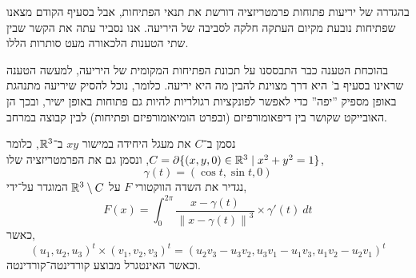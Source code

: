 \subquestion{}
בהגדרה של יריעות פתוחות פרמטריזציה דורשת את תנאי הפתיחות, אבל בסעיף הקודם מצאנו שפתיחות נובעת מקיום העתקה חלקה לסביבה של היריעה.
אנו נסביר עתה את הקשר שבין שתי הטענות הלכאורה מעט סותרות הללו.
\begin{solution}
	בהוכחת הטענה כבר התבססנו על תכונת הפתיחות המקומית של היריעה, למעשה הטענה שראינו בסעיף ב' היא דרך מצוינת להבין מה היא יריעה.
	כלומר, נוכל להסיק שיריעה מתנהגת באופן מספיק ''יפה'' כדי לאפשר לפונקציות רגולריות להיות גם פתוחות באופן ישיר, ובכך הן האובייקט שקושר בין דיפאומורפיזם (ובפרט הומיאומורפיזם ופתיחות) לבין קבוצה במרחב.
\end{solution}

\question{}
נסמן ב־$C$ את מעגל היחידה במישור $xy$ ב־$\mathbb{R}^3$, כלומר $C = \partial \{ (x, y, 0) \in \mathbb{R}^3 \mid x^2 + y^2 = 1 \}$,
ונסמן גם את הפרמטריזציה שלו,
\[
	\gamma(t)
	= (\cos t, \sin t, 0)
\]
נגדיר את השדה הווקטורי $F$ על $\mathbb{R}^3 \setminus C$ המוגדר על־ידי,
\[
	F(x)
	= \int_{0}^{2 \pi} \frac{x - \gamma(t)}{{\lVert x - \gamma(t) \rVert}^3} \times \gamma'(t)\ dt
\]
כאשר,
\[
	{(u_1, u_2, u_3)}^t \times {(v_1, v_2, v_3)}^t
	= {(u_2 v_3 - u_3 v_2, u_3 v_1 - u_1 v_3, u_1 v_2 - u_2 v_1)}^t
\]
וכאשר האינטגרל מבוצע קורדינטה־קורדינטה.

